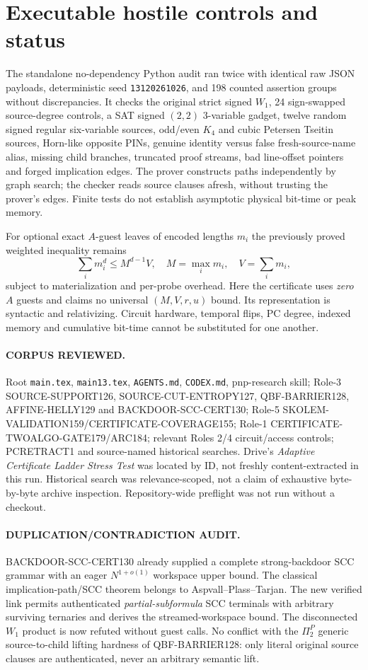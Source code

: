 \documentclass[11pt]{article}
\begin{document}
\section{Executable hostile controls and status}
The standalone no-dependency Python audit ran twice with identical raw JSON payloads, deterministic seed \texttt{13120261026}, and 198 counted assertion groups without discrepancies. It checks the original strict signed $W_1$, 24 sign-swapped source-degree controls, a SAT signed $(2,2)$ 3-variable gadget, twelve random signed regular six-variable sources, odd/even $K_4$ and cubic Petersen Tseitin sources, Horn-like opposite PINs, genuine identity versus false fresh-source-name alias, missing child branches, truncated proof streams, bad line-offset pointers and forged implication edges. The prover constructs paths independently by graph search; the checker reads source clauses afresh, without trusting the prover's edges. Finite tests do not establish asymptotic physical bit-time or peak memory.

For optional exact $A$-guest leaves of encoded lengths $m_i$ the previously proved weighted inequality remains
\[
\sum_i m_i^d\le M^{d-1}V,\quad M=\max_i m_i,\quad V=\sum_i m_i,
\]
subject to materialization and per-probe overhead. Here the certificate uses \emph{zero} $A$ guests and claims no universal $(M,V,r,u)$ bound. Its representation is syntactic and relativizing. Circuit hardware, temporal flips, PC degree, indexed memory and cumulative bit-time cannot be substituted for one another.

\paragraph{CORPUS REVIEWED.}
Root \texttt{main.tex}, \texttt{main13.tex}, \texttt{AGENTS.md}, \texttt{CODEX.md}, pnp-research skill; Role-3 SOURCE-SUPPORT126, SOURCE-CUT-ENTROPY127, QBF-BARRIER128, AFFINE-HELLY129 and BACKDOOR-SCC-CERT130; Role-5 SKOLEM-VALIDATION159/CERTIFICATE-COVERAGE155; Role-1 CERTIFICATE-TWOALGO-GATE179/ARC184; relevant Roles 2/4 circuit/access controls; PCRETRACT1 and source-named historical searches. Drive's \emph{Adaptive Certificate Ladder Stress Test} was located by ID, not freshly content-extracted in this run. Historical search was relevance-scoped, not a claim of exhaustive byte-by-byte archive inspection. Repository-wide preflight was not run without a checkout.

\paragraph{DUPLICATION/CONTRADICTION AUDIT.}
BACKDOOR-SCC-CERT130 already supplied a complete strong-backdoor SCC grammar with an eager $N^{1+o(1)}$ workspace upper bound. The classical implication-path/SCC theorem belongs to Aspvall--Plass--Tarjan. The new verified link permits authenticated \emph{partial-subformula} SCC terminals with arbitrary surviving ternaries and derives the streamed-workspace bound. The disconnected $W_1$ product is now refuted without guest calls. No conflict with the $\Pi_2^P$ generic source-to-child lifting hardness of QBF-BARRIER128: only literal original source clauses are authenticated, never an arbitrary semantic lift.
\end{document}
